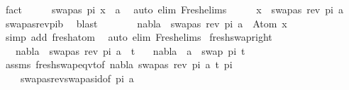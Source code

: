 \begin{isabellebody}
\ fact\isanewline
\ \ \isamarkupfalse%
\ \isamarkupfalse%
\ {\isachardoublequoteopen}swapas\ pi\ x\ {\isasymnoteq}\ a{\isachardoublequoteclose}\ \isamarkupfalse%
\ {\isacharparenleft}{\kern0pt}auto\ elim{\isacharcolon}{\kern0pt}\ Fresh{\isacharunderscore}{\kern0pt}elims{\isacharparenright}{\kern0pt}\isanewline
\ \ \isamarkupfalse%
\ \isamarkupfalse%
\ {\isachardoublequoteopen}x\ {\isasymnoteq}\ swapas\ {\isacharparenleft}{\kern0pt}rev\ pi{\isacharparenright}{\kern0pt}\ a{\isachardoublequoteclose}\ \isamarkupfalse%
\ swapas{\isacharunderscore}{\kern0pt}rev{\isacharunderscore}{\kern0pt}pi{\isacharunderscore}{\kern0pt}b\ \isamarkupfalse%
\ blast\ \ \isanewline
\ \ \isamarkupfalse%
\ \isamarkupfalse%
\ {\isachardoublequoteopen}nabla\ {\isasymturnstile}\ swapas\ {\isacharparenleft}{\kern0pt}rev\ pi{\isacharparenright}{\kern0pt}\ a\ {\isasymsharp}\ Atom\ x{\isachardoublequoteclose}\isanewline
\ \ \ \ \isamarkupfalse%
\ {\isacharparenleft}{\kern0pt}simp\ add{\isacharcolon}{\kern0pt}\ fresh{\isacharunderscore}{\kern0pt}atom{\isacharparenright}{\kern0pt}\ \isanewline
{}\isamarkupfalse%
\ {\isacharparenleft}{\kern0pt}auto\ elim{\isacharcolon}{\kern0pt}\ Fresh{\isacharunderscore}{\kern0pt}elims{\isacharparenright}{\kern0pt}%
\endisatagproof
{\isafoldproof}%
%
\isadelimproof
\isanewline
%
\endisadelimproof
\isanewline
{}\isamarkupfalse%
\ fresh{\isacharunderscore}{\kern0pt}swap{\isacharunderscore}{\kern0pt}right{\isacharcolon}{\kern0pt}\ \isanewline
\ \ \ {\isachardoublequoteopen}nabla\ {\isasymturnstile}\ swapas\ {\isacharparenleft}{\kern0pt}rev\ pi{\isacharparenright}{\kern0pt}\ a\ {\isasymsharp}\ t{\isachardoublequoteclose}\isanewline
\ \ \ {\isachardoublequoteopen}nabla\ {\isasymturnstile}\ a\ {\isasymsharp}\ swap\ pi\ t{\isachardoublequoteclose}\isanewline
%
\isadelimproof
\ \ %
\endisadelimproof
%
\isatagproof
{}\isamarkupfalse%
\ assms\ fresh{\isacharunderscore}{\kern0pt}swap{\isacharunderscore}{\kern0pt}eqvt{\isacharbrackleft}{\kern0pt}of\ nabla\ {\isacartoucheopen}swapas\ {\isacharparenleft}{\kern0pt}rev\ pi{\isacharparenright}{\kern0pt}\ a{\isacartoucheclose}\ t\ pi{\isacharbrackright}{\kern0pt}\ \isanewline
\ \ \ \ swapas{\isacharunderscore}{\kern0pt}rev{\isacharunderscore}{\kern0pt}swapas{\isacharunderscore}{\kern0pt}id{\isacharbrackleft}{\kern0pt}of\ pi\ a{\isacharbrackright}{\kern0pt}\ \isamarkupfalse%

\end{isabellebody}
